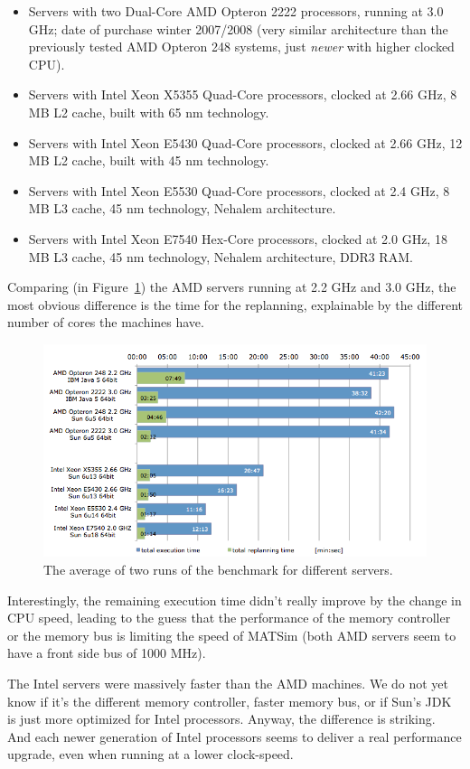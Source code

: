 \begin{itemize}
\item Servers with two Dual-Core AMD Opteron 2222 processors, running at 3.0 GHz; date of purchase winter 2007/2008 (very similar architecture than the previously tested AMD Opteron 248 systems, just \emph{newer} with higher clocked CPU).
\item Servers with Intel Xeon X5355 Quad-Core processors, clocked at 2.66 GHz, 8 MB L2 cache, built with 65 nm technology.
\item Servers with Intel Xeon E5430 Quad-Core processors, clocked at 2.66 GHz, 12 MB L2 cache, built with 45 nm technology.
\item Servers with Intel Xeon E5530 Quad-Core processors, clocked at 2.4 GHz, 8 MB L3 cache, 45 nm technology, Nehalem architecture.
\item Servers with Intel Xeon E7540 Hex-Core processors, clocked at 2.0 GHz, 18 MB L3 cache, 45 nm technology, Nehalem architecture, DDR3 RAM.
\end{itemize}
Comparing (in Figure~\ref{fig:Benchmark02}) the AMD servers running at 2.2 GHz and 3.0 GHz, the most obvious difference is the time for the replanning, explainable by the different number of cores the machines have. 
\begin{figure}[h]
\centering
\includegraphics[width=0.75\linewidth]{figures/benchmarks/benchmark2}
\caption{The average of two runs of the benchmark for different servers.}
\label{fig:Benchmark02}
\end{figure}
Interestingly, the remaining execution time didn't really improve by the change in CPU speed, leading to the guess that the performance of the memory controller or the memory bus is limiting the speed of MATSim (both AMD servers seem to have a front side bus of 1000 MHz).

The Intel servers were massively faster than the AMD machines. We do not yet know if it's the different memory controller, faster memory bus, or if Sun's JDK is just more optimized for Intel processors. Anyway, the difference is striking. And each newer generation of Intel processors seems to deliver a real performance upgrade, even when running at a lower clock-speed.

